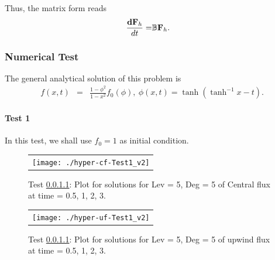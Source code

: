 \documentclass[final,leqno]{siamltex704}
\begin{document}
Thus, the matrix form reads
\begin{eqnarray*}
\dfrac{{\bf dF}_h}{dt} =& \mathbb{B}{\bf F}_h.
\end{eqnarray*}

\subsubsection{Numerical Test}
The general analytical solution of this problem is
\begin{eqnarray*}
f(x,t)&=&\frac{1-\phi^2}{1-x^2}f_0(\phi),\
\phi(x,t)=\tanh(\tanh^{-1}x-t).
\end{eqnarray*}

\paragraph{Test 1}\label{Num-2}
In this test, we shall use $f_0=1$ as initial condition.

\begin{figure}[H]
\centering
\begin{tabular}{c}
  \texttt{[image: ./hyper-cf-Test1\_v2]}
  \end{tabular}
\caption{Test \ref{Num-2}: Plot for solutions for Lev = 5, Deg = 5 of Central flux at time = 0.5, 1, 2, 3.}
\end{figure}



\begin{figure}[H]
\centering
\begin{tabular}{c}
  \texttt{[image: ./hyper-uf-Test1\_v2]}
  \end{tabular}
\caption{Test \ref{Num-2}: Plot for solutions for Lev = 5, Deg = 5 of upwind flux at time = 0.5, 1, 2, 3.}
\end{figure}

\end{document}
